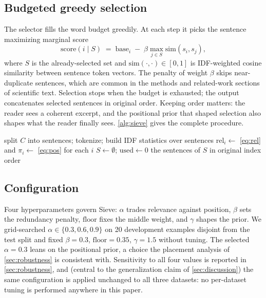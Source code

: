 \documentclass[preprint,12pt]{elsarticle}
\DeclarePairedDelimiter\abs{\lvert}{\rvert}
\theoremstyle{remark}
\newcommand{\method}{Sieve}
\begin{document}
\subsection{Budgeted greedy selection}
The selector fills the word budget greedily. At each step it picks the
sentence maximizing marginal score
\begin{equation}
\label{eq:mmr}
\mathrm{score}(i \mid S) \;=\; \mathrm{base}_i
\;-\; \beta \max_{j \in S} \mathrm{sim}(s_i, s_j),
\end{equation}
where $S$ is the already-selected set and
$\mathrm{sim}(\cdot,\cdot)\in[0,1]$ is IDF-weighted cosine similarity
between sentence token vectors. The penalty of weight $\beta$ skips
near-duplicate sentences, which are common in the methods and
related-work sections of scientific text. Selection stops when the
budget is exhausted; the output concatenates selected sentences in
original order. Keeping order matters: the reader sees a coherent
excerpt, and the positional prior that shaped selection also shapes
what the reader finally sees. \autoref{alg:sieve} gives the complete
procedure.

\begin{algorithm}[t]
\caption{\method{} selection}
\label{alg:sieve}
split $C$ into sentences; tokenize; build IDF statistics over
sentences\;
$\mathrm{rel}_i \leftarrow$ \eqref{eq:rel} and
$\pi_i \leftarrow$ \eqref{eq:pos} for each $i$\;
$S \leftarrow \emptyset$; $\mathrm{used} \leftarrow 0$\;
\Return the sentences of $S$ in original index order
\end{algorithm}

\subsection{Configuration}
Four hyperparameters govern \method{}: $\alpha$ trades relevance
against position, $\beta$ sets the redundancy penalty, $\mathrm{floor}$
fixes the middle weight, and $\gamma$ shapes the prior. We
grid-searched $\alpha \in \{0.3, 0.6, 0.9\}$ on 20 development
examples disjoint from the test split and fixed $\beta=0.3$,
$\mathrm{floor}=0.35$, $\gamma=1.5$ without tuning. The selected
$\alpha=0.3$ leans on the positional prior, a choice the placement
analysis of \autoref{sec:robustness} is consistent with. Sensitivity
to all four values is reported in \autoref{sec:robustness}, and
(central to the generalization claim of \autoref{sec:discussion}) the
same configuration is applied unchanged to all three datasets: no
per-dataset tuning is performed anywhere in this paper.
\end{document}
